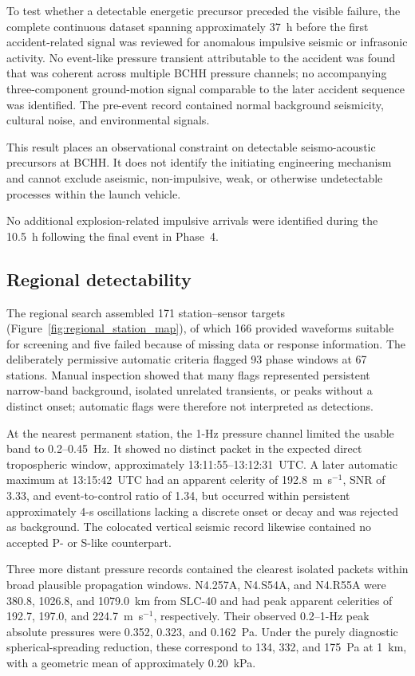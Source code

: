 \documentclass[]{seismica}
\begin{document}
To test whether a detectable energetic precursor preceded the visible failure,
the complete continuous dataset spanning approximately 37~h before the first
accident-related signal was reviewed for anomalous impulsive seismic or
infrasonic activity. No event-like pressure transient attributable to the
accident was found that was coherent across multiple BCHH pressure channels;
no accompanying three-component ground-motion signal comparable to the later
accident sequence was identified. The pre-event record contained normal
background seismicity, cultural noise, and environmental signals.

This result places an observational constraint on detectable seismo-acoustic
precursors at BCHH. It does not identify the initiating engineering mechanism
and cannot exclude aseismic, non-impulsive, weak, or otherwise undetectable
processes within the launch vehicle.

No additional explosion-related impulsive arrivals were identified during the
10.5~h following the final event in Phase~4.

\subsection{Regional detectability}
\label{sec:results_regional}

The regional search assembled 171 station--sensor targets
(Figure~\ref{fig:regional_station_map}), of which 166
provided waveforms suitable for screening and five failed because of missing
data or response information. The deliberately permissive automatic criteria
flagged 93 phase windows at 67 stations. Manual inspection showed that many
flags represented persistent narrow-band background, isolated unrelated
transients, or peaks without a distinct onset; automatic flags were therefore
not interpreted as detections.

At the nearest permanent station, the 1-Hz pressure channel limited the usable
band to 0.2--0.45~Hz. It showed no distinct packet in the expected direct
tropospheric window, approximately 13:11:55--13:12:31~UTC. A later automatic
maximum at 13:15:42~UTC had an apparent celerity of 192.8~m~s$^{-1}$, SNR of
3.33, and event-to-control ratio of 1.34, but occurred within persistent
approximately 4-s oscillations lacking a discrete onset or decay and was
rejected as background. The colocated vertical seismic record likewise
contained no accepted P- or S-like counterpart.

Three more distant pressure records contained the clearest isolated packets
within broad plausible propagation windows. N4.257A, N4.S54A, and N4.R55A
were 380.8, 1026.8, and 1079.0~km from SLC-40 and had peak apparent
celerities of 192.7, 197.0, and 224.7~m~s$^{-1}$, respectively. Their observed
0.2--1-Hz peak absolute pressures were 0.352, 0.323, and 0.162~Pa. Under the
purely diagnostic spherical-spreading reduction, these correspond to 134,
332, and 175~Pa at 1~km, with a geometric mean of approximately 0.20~kPa.
\end{document}
